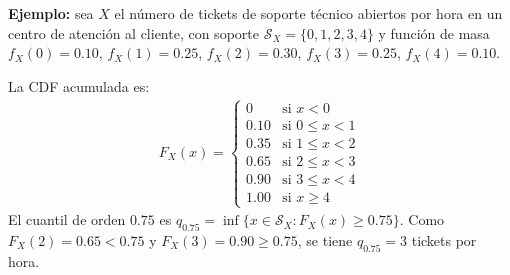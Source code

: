 \begin{solproblema}[prob:e538b1b]
	\textbf{Ejemplo:} sea $X$ el número de tickets de soporte técnico abiertos por hora en un centro de atención al cliente, con soporte $\mathcal{S}_X=\{0,1,2,3,4\}$ y función de masa $f_X(0)=0.10$, $f_X(1)=0.25$, $f_X(2)=0.30$, $f_X(3)=0.25$, $f_X(4)=0.10$.

	La CDF acumulada es:
	\begin{align*}
		F_X(x) = \begin{cases}
			0 & \text{si } x<0 \\
			0.10 & \text{si } 0\le x<1 \\
			0.35 & \text{si } 1\le x<2 \\
			0.65 & \text{si } 2\le x<3 \\
			0.90 & \text{si } 3\le x<4 \\
			1.00 & \text{si } x\ge4
		\end{cases}
	\end{align*}
	El cuantil de orden $0.75$ es $q_{0.75} = \inf\{x \in \mathcal{S}_X : F_X(x)\ge0.75\}$. Como $F_X(2)=0.65<0.75$ y $F_X(3)=0.90\ge0.75$, se tiene $q_{0.75}=3$ tickets por hora.
\end{solproblema}
